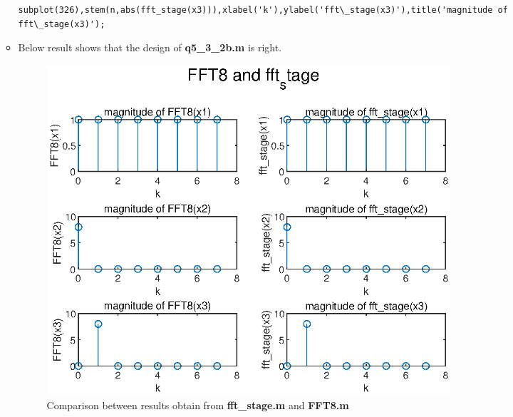 \documentclass[onecolumn,oneside]{SUSTechHomework}
\begin{document}
\begin{itemize}
\begin{itemize}
\begin{lstlisting}[title=\textbf{q5\_3\_2b.m}]
	subplot(326),stem(n,abs(fft_stage(x3))),xlabel('k'),ylabel('fft\_stage(x3)'),title('magnitude of fft\_stage(x3)');
\end{lstlisting}
		\item Below result shows that the design of \textbf{q5\_3\_2b.m} is right.
		\begin{figure}[H]
			\centering
			\includegraphics[width=150mm]{pictures/q5_3_2b.eps}
			\caption{Comparison between results obtain from \textbf{fft\_stage.m} and \textbf{FFT8.m}}
		\end{figure}
	\end{itemize}
\end{itemize}
\end{document}
